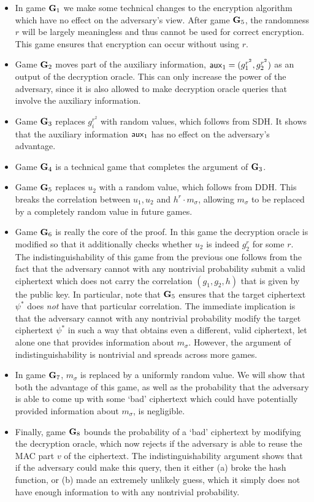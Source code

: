 \begin{itemize}
	\item In game $\mathbf{G}_1$ we make some technical changes to the encryption algorithm which have no effect on the adversary's view. After game $\mathbf{G}_5$, the randomness $r$ will be largely meaningless and thus cannot be used for correct encryption. This game ensures that encryption can occur without using $r$.
	\item Game $\mathbf{G}_2$ moves part of the auxiliary information, $\mathsf{aux}_1 =(g_1^{r^2}, g_2^{r^2})$ as an output of the decryption oracle. This can only increase the power of the adversary, since it is also allowed to make decryption oracle queries that involve the auxiliary information.
	\item Game $\mathbf{G}_3$ replaces $g_i^{r^2}$ with random values, which follows from SDH. It shows that the auxiliary information $\mathsf{aux}_1$ has no effect on the adversary's advantage.
	\item Game $\mathbf{G}_4$ is a technical game that completes the argument of $\mathbf{G}_3$.
	\item Game $\mathbf{G}_5$ replaces $u_2$ with a random value, which follows from DDH. This breaks the correlation between $u_1, u_2$ and $h^r\cdot m_\sigma$, allowing $m_\sigma$ to be replaced by a completely random value in future games.
	\item Game $\mathbf{G}_6$ is really the core of the proof. In this game the decryption oracle is modified so that it additionally checks whether $u_2$ is indeed $g_2^r$ for some $r$. The indistinguishability of this game from the previous one follows from the fact that the adversary cannot with any nontrivial probability submit a valid ciphertext which does not carry the correlation $(g_1, g_2, h)$ that is given by the public key. In particular, note that $\mathbf{G}_5$ ensures that the target ciphertext $\psi^{*}$ does \textit{not} have that particular correlation. The immediate implication is that the adversary cannot with any nontrivial probability modify the target ciphertext $\psi^{*}$ in such a way that obtains even a different, valid ciphertext, let alone one that provides information about $m_\sigma$. However, the argument of indistinguishability is nontrivial and spreads across more games.
	\item In game $\mathbf{G}_7$, $m_\sigma$ is replaced by a uniformly random value. We will show that both the advantage of this game, as well as the probability that the adversary is able to come up with some `bad' ciphertext which could have potentially provided information about $m_\sigma$, is negligible.
	\item Finally, game $\mathbf{G}_8$ bounds the probability of a `bad' ciphertext by modifying the decryption oracle, which now rejects if the adversary is able to reuse the MAC part $v$ of the ciphertext. The indistinguishability argument shows that if the adversary could make this query, then it either (a) broke the hash function, or (b) made an extremely unlikely guess, which it simply does not have enough information to with any nontrivial probability.
\end{itemize}

